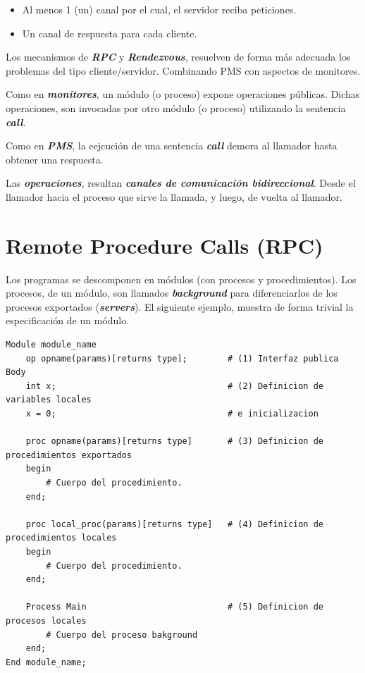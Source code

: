 \documentclass[a4paper, 10pt]{report}
\begin{document}
\begin{itemize}
    \item Al menos 1 (un) canal por el cual, el servidor reciba peticiones.
    \item Un canal de respuesta para cada cliente.
\end{itemize}

Los mecanismos de \textbf{\emph{RPC}} y \textbf{\emph{Rendezvous}}, resuelven de forma más adecuada los problemas del tipo cliente/servidor. Combinando PMS con aspectos de monitores.

Como en \textbf{\emph{monitores}}, un módulo (o proceso) expone operaciones públicas. Dichas operaciones, son invocadas por otro módulo (o proceso) utilizando la sentencia \textbf{\emph{call}}.

Como en \textbf{\emph{PMS}}, la eejcución de una sentencia \textbf{\emph{call}} demora al llamador hasta obtener una respuesta.

Las \textbf{\emph{operaciones}}, resultan \textbf{\emph{canales de comunicación bidireccional}}. Desde el llamador hacia el proceso que sirve la llamada, y luego, de vuelta al llamador.


\section{Remote Procedure Calls (RPC)}

Los programas se descomponen en módulos (con procesos y procedimientos). Los procesos, de un módulo, son llamados \textbf{\emph{background}} para diferenciarlos de los procesos exportados (\textbf{\emph{servers}}). El siguiente ejemplo, muestra de forma trivial la especificación de un módulo.

\begin{lstlisting}
Module module_name
    op opname(params)[returns type];        # (1) Interfaz publica
Body
    int x;                                  # (2) Definicion de variables locales
    x = 0;                                  # e inicializacion    

    proc opname(params)[returns type]       # (3) Definicion de procedimientos exportados
    begin
        # Cuerpo del procedimiento.
    end;

    proc local_proc(params)[returns type]   # (4) Definicion de procedimientos locales
    begin
        # Cuerpo del procedimiento.
    end;

    Process Main                            # (5) Definicion de procesos locales
        # Cuerpo del proceso bakground
    end;
End module_name;
\end{lstlisting}
\end{document}
